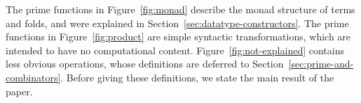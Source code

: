 %

The prime functions in Figure~\ref{fig:monad} describe the monad structure of terms and folds, and were explained in Section~\ref{sec:datatype-constructors}. The prime functions in Figure~\ref{fig:product} are  simple syntactic transformations, which are intended to have no computational content.  Figure~\ref{fig:not-explained} contains   less obvious operations, whose definitions are  deferred to Section~\ref{sec:prime-and-combinators}. Before giving these definitions, we state the main result of the paper. 




